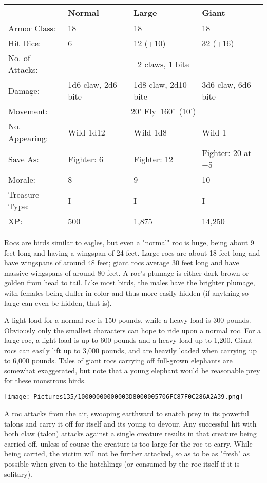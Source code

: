 \documentclass[a4paper,twoside,openany,10pt]{book}
\begin{document}
\begin{multicols}{2}
\begin{tabularx}{0.50\textwidth}{@{}lXXX@{}}
& Normal & Large & Giant \\\hline
Armor Class: & 18 & 18 & 18 \\\hline
Hit Dice: & 6 & 12 (+10) & 32 (+16) \\\hline
No. of Attacks: &\multicolumn{3}{c}{2 claws, 1 bite} \\\hline
Damage: & 1d6 claw, 2d6 bite & 1d8 claw, 2d10 bite & 3d6 claw, 6d6 bite \\\hline
Movement: & \multicolumn{3}{c}{20' Fly~160'~(10')} \\\hline
No. Appearing: & Wild 1d12 & Wild 1d8 & Wild 1 \\\hline
Save As: & Fighter: 6 & Fighter: 12 & Fighter: 20 at +5 \\\hline
Morale: & 8 & 9 & 10 \\\hline
Treasure Type: & I & I & I \\\hline
XP: & 500 & 1,875 & 14,250 \\\hline
\end{tabularx}\medskip

Rocs are birds similar to eagles, but even a "normal" roc is huge, being about 9 feet long and having a wingspan of 24 feet. Large rocs are about 18 feet long and have wingspans of around 48 feet; giant rocs average 30 feet long and have massive wingspans of around 80 feet. A roc's plumage is either dark brown or golden from head to tail. Like most birds, the males have the brighter plumage, with females being duller in color and thus more easily hidden (if anything so large can even be hidden, that is).

A light load for a normal roc is 150 pounds, while a heavy load is 300 pounds. Obviously only the smallest characters can hope to ride upon a normal roc. For a large roc, a light load is up to 600 pounds and a heavy load up to 1,200.  Giant rocs can easily lift up to 3,000 pounds, and are heavily loaded when carrying up to 6,000 pounds. Tales of giant rocs carrying off full-grown elephants are somewhat exaggerated, but note that a young elephant would be reasonable prey for these monstrous birds. 


\begin{center} \texttt{[image: Pictures135/10000000000003D8000005706FC87F0C286A2A39.png]} \end{center}

A roc attacks from the air, swooping earthward to snatch prey in its powerful talons and carry it off for itself and its young to devour. Any successful hit with both claw (talon) attacks against a single creature results in that creature being carried off, unless of course the creature is too large for the roc to carry. While being carried, the victim will not be further attacked, so as to be as "fresh" as possible when given to the hatchlings (or consumed by the roc itself if it is solitary).


\end{multicols}
\end{document}
